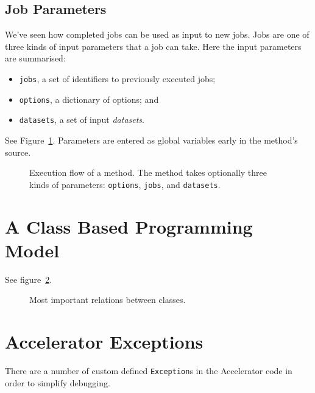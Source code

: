 \subsection{Job Parameters}
\label{sec:jobparams}
We've seen how completed jobs can be used as input to new
jobs.  Jobs are one of three kinds of input parameters that
a job can take.  Here the input parameters are summarised:
\begin{itemize}
\item[] \texttt{jobs}, a set of identifiers to previously executed jobs;
\item[] \texttt{options}, a dictionary of options; and
\item[] \texttt{datasets}, a set of input \textsl{datasets}.
\end{itemize}
See Figure~\ref{fig:execflow}.  Parameters are entered as global
variables early in the method's source.


\begin{figure}[h!]
  \begin{center}
    
    \caption{Execution flow of a method.  The method takes optionally
      three kinds of parameters: \texttt{options}, \texttt{jobs},
      and \texttt{datasets}.}
    \label{fig:execflow}
  \end{center}
\end{figure}





\section{A Class Based Programming Model}
See figure~\ref{fig:classes}.
\begin{figure}[h!]
  \begin{center}
    
    \caption{Most important relations between classes.}
    \label{fig:classes}
  \end{center}
\end{figure}



\section{Accelerator Exceptions}
There are a number of custom defined \texttt{Exception}s in the
Accelerator code in order to simplify debugging.




